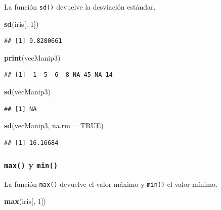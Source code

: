 \documentclass[]{book}
\newenvironment{Shaded}{\begin{snugshade}}{\end{snugshade}}
\newcommand{\KeywordTok}[1]{\textcolor[rgb]{0.13,0.29,0.53}{\textbf{#1}}}
\newcommand{\DataTypeTok}[1]{\textcolor[rgb]{0.13,0.29,0.53}{#1}}
\newcommand{\DecValTok}[1]{\textcolor[rgb]{0.00,0.00,0.81}{#1}}
\newcommand{\OtherTok}[1]{\textcolor[rgb]{0.56,0.35,0.01}{#1}}
\newcommand{\NormalTok}[1]{#1}
\begin{document}
La función \texttt{sd()} devuelve la desviación estándar.

\begin{Shaded}
\begin{Highlighting}[]
\KeywordTok{sd}\NormalTok{(iris[, }\DecValTok{1}\NormalTok{])}
\end{Highlighting}
\end{Shaded}

\begin{verbatim}
## [1] 0.8280661
\end{verbatim}

\begin{Shaded}
\begin{Highlighting}[]
\KeywordTok{print}\NormalTok{(vecManip3)}
\end{Highlighting}
\end{Shaded}

\begin{verbatim}
## [1]  1  5  6  8 NA 45 NA 14
\end{verbatim}

\begin{Shaded}
\begin{Highlighting}[]
\KeywordTok{sd}\NormalTok{(vecManip3)}
\end{Highlighting}
\end{Shaded}

\begin{verbatim}
## [1] NA
\end{verbatim}

\begin{Shaded}
\begin{Highlighting}[]
\KeywordTok{sd}\NormalTok{(vecManip3, }\DataTypeTok{na.rm =} \OtherTok{TRUE}\NormalTok{)}
\end{Highlighting}
\end{Shaded}

\begin{verbatim}
## [1] 16.16684
\end{verbatim}

\subsubsection{\texorpdfstring{\texttt{max()} y
\texttt{min()}}{max() y min()}}\label{l015max}

La función \texttt{max()} devuelve el valor máximo y \texttt{min()} el
valor mínimo.

\begin{Shaded}
\begin{Highlighting}[]
\KeywordTok{max}\NormalTok{(iris[, }\DecValTok{1}\NormalTok{])}
\end{Highlighting}
\end{Shaded}
\end{document}
